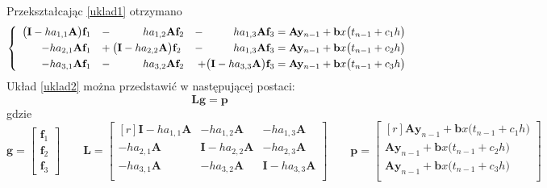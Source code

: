 \documentclass[a4paper, 12pt, twoside, openany]{article}
\newcommand{\y}{\mathbf{y}}
\newcommand{\I}{\mathbf{I}}
\newcommand{\A}{\mathbf{A}}
\newcommand{\f}{\mathbf{f}}
\renewcommand{\b}{\mathbf{b}}
\begin{document}
    Przekształcając \eqref{uklad1} otrzymano
    \begin{equation}
        \label{uklad2}
        \left\{\begin{array}{c}
            \begin{aligned}
                \big(\I - ha_{1,1}\A\big)\f_1 \hspace{0.8em} &- \hspace{1cm} ha_{1,2}\A\f_2   &- \hspace{1cm} ha_{1,3}\A\f_3    &= \A\y_{n-1} + \b x\big(t_{n-1} + c_1h\big)\\
                -ha_{2,1}\A\f_1               \hspace{0.8em} &+ \big(\I - ha_{2,2}\A\big)\f_2 &- \hspace{1cm} ha_{1,3}\A\f_3    &= \A\y_{n-1} + \b x\big(t_{n-1} + c_2h\big)\\
                -ha_{3,1}\A\f_1               \hspace{0.8em} &- \hspace{1cm} ha_{3,2}\A\f_2   &+ \big(\I - ha_{3,3}\A\big)\f_3  &= \A\y_{n-1} + \b x\big(t_{n-1} + c_3h\big)\\
            \end{aligned}
        \end{array}\right.
    \end{equation}
    Układ \eqref{uklad2} można przedstawić w następującej postaci:
    \begin{equation}
        \label{uklad}
        \mathbf{L}\mathbf{g} = \mathbf{p}
    \end{equation}
    gdzie
    $$
    \mathbf{g} = \begin{bmatrix} \f_1 \\ \f_2 \\ \f_3 \end{bmatrix} \qquad
    \mathbf{L} = \begin{bmatrix*}[r]
        \I - ha_{1,1}\A & -ha_{1,2}\A     & -ha_{1,3}\A   \\
        -ha_{2,1}\A     & \I - ha_{2,2}\A & -ha_{2,3}\A   \\
        -ha_{3,1}\A     & -ha_{3,2}\A     & \I - ha_{3,3}\A \\
    \end{bmatrix*} \qquad
    \mathbf{p} = \begin{bmatrix*}[r]
        \A\y_{n-1} + \b x\big(t_{n-1} + c_1h\big)\\
        \A\y_{n-1} + \b x\big(t_{n-1} + c_2h\big)\\
        \A\y_{n-1} + \b x\big(t_{n-1} + c_3h\big)\\
    \end{bmatrix*}
    $$
\end{document}
